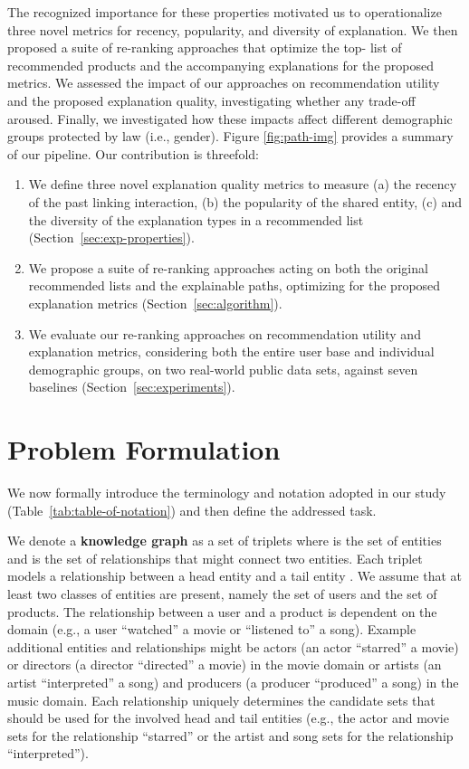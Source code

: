 \documentclass[sigconf]{acmart}
\begin{document}
The recognized importance for these properties motivated us to operationalize three novel metrics for recency, popularity, and diversity of explanation. 
We then proposed a suite of re-ranking approaches that optimize the top- list of recommended products and the accompanying explanations for the proposed metrics.
We assessed the impact of our approaches on recommendation utility and the proposed explanation quality, investigating whether any trade-off aroused. 
Finally, we investigated how these impacts affect different demographic groups protected by law (i.e., gender). Figure \ref{fig:path-img} provides a summary of our pipeline. 
Our contribution is threefold:
\begin{enumerate}

\item We define three novel explanation quality metrics to measure (a) the recency of the past linking interaction, (b) the popularity of the shared entity, (c) and the diversity of the explanation types in a recommended list (Section~\ref{sec:exp-properties}).

\item We propose a suite of re-ranking approaches acting on both the original recommended lists and the explainable paths, optimizing for the proposed explanation metrics (Section~\ref{sec:algorithm}). 

\item We evaluate our re-ranking approaches on recommendation utility and explanation metrics, considering both the entire user base and individual demographic groups, on two real-world public data sets, against seven baselines (Section~\ref{sec:experiments}).
\end{enumerate}

\section{Problem Formulation}\label{sec:preliminaries}
We now formally introduce the terminology and notation adopted in our study (Table~\ref{tab:table-of-notation}) and then define the addressed task. 

We denote a \textbf{knowledge graph} as a set of triplets  where  is the set of entities and  is the set of relationships that might connect two entities. 
Each triplet  models a relationship  between a head entity  and a tail entity . 
We assume that at least two classes of entities are present, namely the set  of users and the set  of products. 
The relationship  between a user and a product is dependent on the domain (e.g., a user ``watched'' a movie or ``listened to'' a song). 
Example additional entities and relationships might be actors (an actor ``starred'' a movie) or directors (a director ``directed'' a movie) in the movie domain or artists (an artist ``interpreted'' a song) and producers (a producer ``produced'' a song) in the music domain.  
Each relationship  uniquely determines the candidate sets that should be used for the involved head and tail entities (e.g., the actor and movie sets for the relationship ``starred'' or the artist and song sets for the relationship ``interpreted''). 
\end{document}
